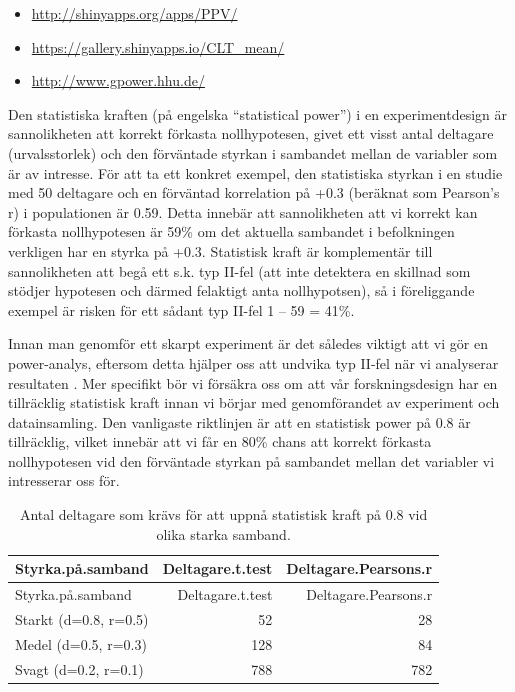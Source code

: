 \documentclass[
]{book}
\providecommand{\tightlist}{%
  \setlength{\itemsep}{0pt}\setlength{\parskip}{0pt}}
\begin{document}
\begin{itemize}
\tightlist
\item
  \url{http://shinyapps.org/apps/PPV/}
\item
  \url{https://gallery.shinyapps.io/CLT_mean/}
\item
  \url{http://www.gpower.hhu.de/}
\end{itemize}

Den statistiska kraften (på engelska ``statistical power'') i en experimentdesign är sannolikheten att korrekt förkasta nollhypotesen, givet ett visst antal deltagare (urvalsstorlek) och den förväntade styrkan i sambandet mellan de variabler som är av intresse. För att ta ett konkret exempel, den statistiska styrkan i en studie med 50 deltagare och en förväntad korrelation på +0.3 (beräknat som Pearson's r) i populationen är 0.59. Detta innebär att sannolikheten att vi korrekt kan förkasta nollhypotesen är 59\% om det aktuella sambandet i befolkningen verkligen har en styrka på +0.3. Statistisk kraft är komplementär till sannolikheten att begå ett s.k. typ II-fel (att inte detektera en skillnad som stödjer hypotesen och därmed felaktigt anta nollhypotsen), så i föreliggande exempel är risken för ett sådant typ II-fel 1 -- 59 = 41\%.

Innan man genomför ett skarpt experiment är det således viktigt att vi gör en power-analys, eftersom detta hjälper oss att undvika typ II-fel när vi analyserar resultaten \citep{cohen1992power}. Mer specifikt bör vi försäkra oss om att vår forskningsdesign har en tillräcklig statistisk kraft innan vi börjar med genomförandet av experiment och datainsamling. Den vanligaste riktlinjen är att en statistisk power på 0.8 är tillräcklig, vilket innebär att vi får en 80\% chans att korrekt förkasta nollhypotesen vid den förväntade styrkan på sambandet mellan det variabler vi intresserar oss för.

\begin{longtable}[]{@{}lrr@{}}
\caption{\label{tab:tab-02-07-1-1-01}Antal deltagare som krävs för att uppnå statistisk kraft på 0.8 vid olika starka samband.}\tabularnewline
\toprule
Styrka.på.samband & Deltagare.t.test & Deltagare.Pearsons.r\tabularnewline
\midrule
\endfirsthead
\toprule
Styrka.på.samband & Deltagare.t.test & Deltagare.Pearsons.r\tabularnewline
\midrule
\endhead
Starkt (d=0.8, r=0.5) & 52 & 28\tabularnewline
Medel (d=0.5, r=0.3) & 128 & 84\tabularnewline
Svagt (d=0.2, r=0.1) & 788 & 782\tabularnewline
\bottomrule
\end{longtable}
\end{document}
